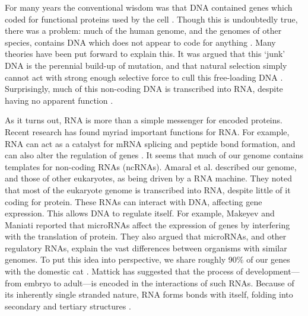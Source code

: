 \documentclass{cshonours}
\begin{document}
For many years the conventional wisdom was that DNA contained genes which coded for functional proteins used by the cell \cite{albertsessential}. Though this is undoubtedly true, there was a problem: much of the human genome, and the genomes of other species, contains DNA which does not appear to code for anything \cite{beaton1999eukaryotic}. Many theories have been put forward to explain this. It was argued that this `junk' DNA is the perennial build-up of mutation, and that natural selection simply cannot act with strong enough selective force to cull this free-loading DNA \cite{beaton1999eukaryotic}. Surprisingly, much of this non-coding DNA is transcribed into RNA, despite having no apparent function \cite{leung2013coral}. 

As it turns out, RNA is more than a simple messenger for encoded proteins. Recent research has found myriad important functions for RNA. For example, RNA can act as a catalyst for mRNA splicing and peptide bond formation, and can also alter the regulation of genes \cite{xu2012statistical}. It seems that much of our genome contains templates for non-coding RNAs (ncRNAs). Amaral et al. \cite{amaral2008eukaryotic} described our genome, and those of other eukaryotes, as being driven by a RNA machine. They noted that most of the eukaryote genome is transcribed into RNA, despite little of it coding for protein. These RNAs can interact with DNA, affecting gene expression. This allows DNA to regulate itself. For example, Makeyev and Maniati \cite{makeyev2008multilevel} reported that microRNAs affect the expression of genes by interfering with the translation of protein. They also argued that microRNAs, and other regulatory RNAs, explain the vast differences between organisms with similar genomes. To put this idea into perspective, we share roughly 90\% of our genes with the domestic cat \cite{pontius2007initial}. Mattick \cite{mattick2007new} has suggested that the process of development---from embryo to adult---is encoded in the interactions of such RNAs. Because of its inherently single stranded nature, RNA forms bonds with itself, folding into secondary and tertiary structures \cite{conn1998rna}.
\end{document}
